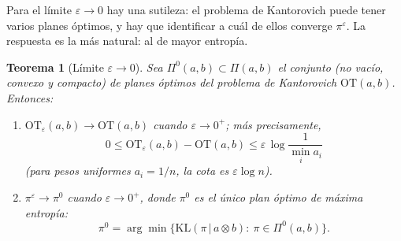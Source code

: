 \documentclass[12pt, a4paper]{amsbook}
\newtheorem{teo}{Teorema}[section]
\theoremstyle{remark}
\theoremstyle{definition}
\numberwithin{section}{chapter}
\numberwithin{subsection}{section}
\numberwithin{equation}{section}
\numberwithin{figure}{chapter}
\begin{document}
Para el límite $\varepsilon\to0$ hay una sutileza: el problema de Kantorovich
puede tener varios planes óptimos, y hay que identificar a cuál de ellos
converge $\pi^\varepsilon$. La respuesta es la más natural: al de mayor
entropía.

\begin{teo}[Límite $\varepsilon\to0$]\label{teo.eps.cero}
Sea $\Pi^0(a,b)\subset\Pi(a,b)$ el conjunto (no vacío, convexo y compacto) de
planes óptimos del problema de Kantorovich $\mathrm{OT}(a,b)$. Entonces:
\begin{enumerate}
\item $\mathrm{OT}_\varepsilon(a,b)\to\mathrm{OT}(a,b)$ cuando $\varepsilon\to0^+$;
más precisamente,
\[
0\le\mathrm{OT}_\varepsilon(a,b)-\mathrm{OT}(a,b)\le\varepsilon\,\log\frac{1}{\min_i a_i}
\]
(para pesos uniformes $a_i=1/n$, la cota es $\varepsilon\log n$).
\item $\pi^\varepsilon\to\pi^0$ cuando $\varepsilon\to0^+$, donde $\pi^0$ es el
único plan óptimo de máxima entropía:
\[
\pi^0=\arg\min\bigl\{\mathrm{KL}(\pi\,|\,a\otimes b):\ \pi\in\Pi^0(a,b)\bigr\}.
\]
\end{enumerate}
\end{teo}
\end{document}

